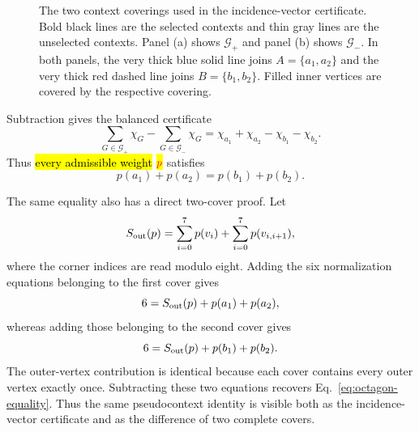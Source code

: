 \documentclass[
  twocolumn,
  aps,
  pra,
  floatfix,
  amsmath,amssymb,
  longbibliography
]{revtex4-2}
\theoremstyle{definition}
\theoremstyle{remark}
\newcommand{\corr}[1]{{\color{red}\hl{#1}}}
\newcommand{\corrmath}[1]{\begingroup\setlength{\fboxsep}{1pt}\colorbox{yellow}{\ensuremath{\color{red}#1}}\endgroup}
\begin{document}
\begin{figure}[t]
\caption{The two context coverings used in the incidence-vector certificate.
Bold black lines are the selected contexts and thin gray lines are the
unselected contexts.  Panel (a) shows $\mathcal G_+$ and panel (b) shows
$\mathcal G_-$.  In both panels, the very thick blue solid line joins
$A=\{a_1,a_2\}$ and the very thick red dashed line joins $B=\{b_1,b_2\}$.  Filled
inner vertices are covered by the respective covering.}
\label{fig:octagon}
\end{figure}

Subtraction gives the balanced certificate
\begin{equation}
 \sum_{G\in\mathcal G_+}\chi_G-
 \sum_{G\in\mathcal G_-}\chi_G
 =\chi_{a_1}+\chi_{a_2}-\chi_{b_1}-\chi_{b_2}.
 \label{eq:octagon-certificate}
\end{equation}
Thus \corr{every admissible weight} \corrmath{p}
satisfies
\begin{equation}
 p(a_1)+p(a_2)=p(b_1)+p(b_2).
 \label{eq:octagon-equality}
\end{equation}

The same equality also has a direct two-cover proof.  Let
\begin{equation*}
 S_{\rm out}(p)=\sum_{i=0}^{7}p(v_i)+
 \sum_{i=0}^{7}p(v_{i,i+1}),
\end{equation*}
where the corner indices are read modulo eight.  Adding the six
normalization equations belonging to the first cover gives
\begin{equation}
 6=S_{\rm out}(p)+p(a_1)+p(a_2),
 \label{eq:octagon-cover-plus}
\end{equation}
whereas adding those belonging to the second cover gives
\begin{equation}
 6=S_{\rm out}(p)+p(b_1)+p(b_2).
 \label{eq:octagon-cover-minus}
\end{equation}
The outer-vertex contribution is identical because each cover contains every
outer vertex exactly once.  Subtracting these two equations recovers
Eq.~\eqref{eq:octagon-equality}.  Thus the same pseudocontext identity is
visible both as the incidence-vector certificate and as the difference of two
complete covers.
\end{document}
